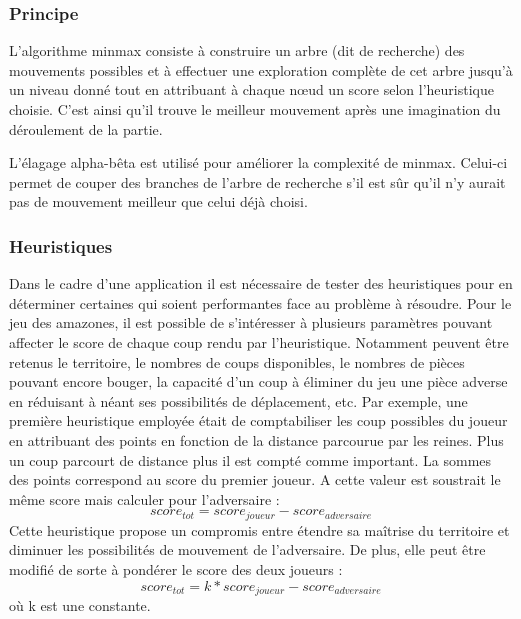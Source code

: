 \documentclass[a4paper]{article}
\begin{document}
\subsubsection{Principe}
L'algorithme minmax consiste à construire un arbre (dit de recherche) des mouvements possibles et à effectuer une exploration complète de cet arbre jusqu'à un niveau donné tout en attribuant à chaque nœud un score selon l'heuristique choisie. C'est ainsi qu'il trouve le meilleur mouvement après une imagination du déroulement de la partie.

L'élagage alpha-bêta est utilisé pour améliorer la complexité de minmax. Celui-ci permet de couper des branches de l'arbre de recherche s'il est sûr qu'il n'y aurait pas de mouvement meilleur que celui déjà choisi.


\subsubsection{Heuristiques}
Dans le cadre d'une application il est nécessaire de tester des heuristiques pour en déterminer certaines qui soient performantes face au problème à résoudre. Pour le jeu des amazones, il est possible de s'intéresser à plusieurs paramètres pouvant affecter le score de chaque coup rendu par l'heuristique. Notamment peuvent être retenus le territoire, le nombres de coups disponibles, le nombres de pièces pouvant encore bouger, la capacité d'un coup à éliminer du jeu une pièce adverse en réduisant à néant ses possibilités de déplacement, etc. Par exemple, une première heuristique employée était de comptabiliser les coup possibles du joueur en attribuant des points en fonction de la distance parcourue par les reines. Plus un coup parcourt de distance plus il est compté comme important. La sommes des points correspond au score du premier joueur. A cette valeur est soustrait le même score mais calculer pour l'adversaire :
\begin{equation}
    score_{tot} = score_{joueur} - score_{adversaire}
\end{equation}
Cette heuristique propose un compromis entre étendre sa maîtrise du territoire et diminuer les possibilités de mouvement de l'adversaire. De plus, elle peut être modifié de sorte à pondérer le score des deux joueurs : 
\begin{equation}
    score_{tot} = k * score_{joueur} - score_{adversaire}
\end{equation}
où k est une constante.
\end{document}
